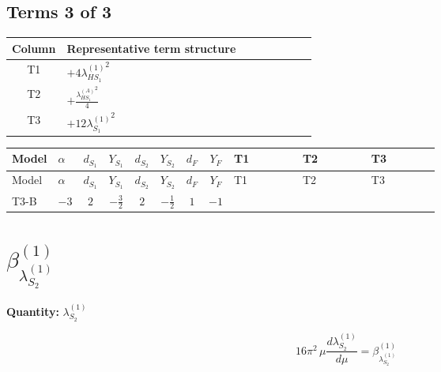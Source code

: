 \documentclass[8pt]{article}
\begin{document}
\begin{landscape}
\subsection*{Terms 3 of 3}
\begin{center}
\begin{tabular}{@{}c >{\raggedright\arraybackslash}p{0.82\linewidth}@{}}
\toprule
Column & Representative term structure \\
\midrule
T1 & \(\displaystyle +4 {\lambda_{HS_1}^{(1)}}^2\) \\
\midrule
T2 & \(\displaystyle +\frac{{\lambda_{HS_1}^{(A)}}^2}{4}\) \\
\midrule
T3 & \(\displaystyle +12 {\lambda_{S_1}^{(1)}}^2\) \\
\midrule
\bottomrule
\end{tabular}
\end{center}
\smallskip
\tiny
\begin{longtable}{@{}llcccccc >{\raggedright\arraybackslash}p{0.21\linewidth} >{\raggedright\arraybackslash}p{0.21\linewidth} >{\raggedright\arraybackslash}p{0.21\linewidth}@{}}
\toprule
Model & $\alpha$ & $d_{S_1}$ & $Y_{S_1}$ & $d_{S_2}$ & $Y_{S_2}$ & $d_F$ & $Y_F$ & T1 & T2 & T3 \\
\midrule
\endfirsthead
\toprule
Model & $\alpha$ & $d_{S_1}$ & $Y_{S_1}$ & $d_{S_2}$ & $Y_{S_2}$ & $d_F$ & $Y_F$ & T1 & T2 & T3 \\
\midrule
\endhead
T3-B & $-3$ & $2$ & $-\frac{3}{2}$ & $2$ & $-\frac{1}{2}$ & $1$ & $-1$ & \scriptsize\adjustbox{max width=\linewidth}{$\begin{gathered} +4 {\lambda_{HS_1}^{(1)}}^2\end{gathered}$} & \scriptsize\adjustbox{max width=\linewidth}{$\begin{gathered} +\frac{{\lambda_{HS_1}^{(A)}}^2}{4}\end{gathered}$} & \scriptsize\adjustbox{max width=\linewidth}{$\begin{gathered} +12 {\lambda_{S_1}^{(1)}}^2\end{gathered}$} \\
\midrule
\bottomrule
\end{longtable}
\clearpage
\section*{$\beta_{\lambda_{S_2}^{(1)}}^{(1)}$}
\noindent\textbf{Quantity: }$\lambda_{S_2}^{(1)}$\par\smallskip
\[16\pi^2\,\mu\frac{d \lambda_{S_2}^{(1)}}{d\mu}=\beta_{\lambda_{S_2}^{(1)}}^{(1)}\]

\end{landscape}
\end{document}

